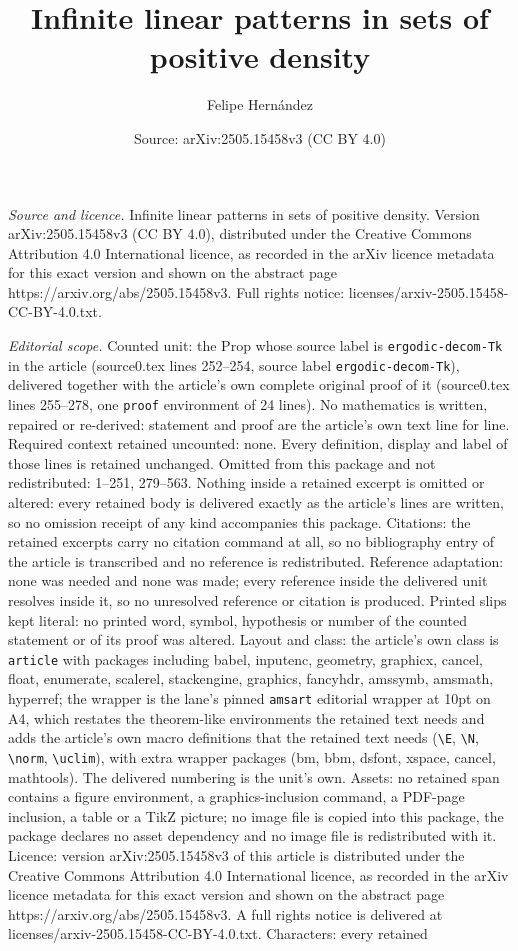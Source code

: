\documentclass[10pt,a4paper]{amsart}
\title[Infinite linear patterns in sets of positive density]{Infinite linear patterns in sets of positive density}
\author{Felipe Hern\'andez}
\date{Source: arXiv:2505.15458v3 (CC BY 4.0)}
\begin{document}
\maketitle

\noindent\emph{Source and licence.} Infinite linear patterns in sets of positive density. Version arXiv:2505.15458v3 (CC BY 4.0), distributed under the Creative Commons Attribution 4.0 International licence, as recorded in the arXiv licence metadata for this exact version and shown on the abstract page https://arxiv.org/abs/2505.15458v3. Full rights notice: licenses/arxiv-2505.15458-CC-BY-4.0.txt.\par\smallskip

\noindent\textit{Editorial scope.} Counted unit: the Prop whose source label is \texttt{ergodic-decom-Tk} in the article (source0.tex lines 252--254, source label \texttt{ergodic-decom-Tk}), delivered together with the article's own complete original proof of it (source0.tex lines 255--278, one \texttt{proof} environment of 24 lines). No mathematics is written, repaired or re-derived: statement and proof are the article's own text line for line. Required context retained uncounted: none. Every definition, display and label of those lines is retained unchanged. Omitted from this package and not redistributed: 1--251, 279--563. Nothing inside a retained excerpt is omitted or altered: every retained body is delivered exactly as the article's lines are written, so no omission receipt of any kind accompanies this package. Citations: the retained excerpts carry no citation command at all, so no bibliography entry of the article is transcribed and no reference is redistributed. Reference adaptation: none was needed and none was made; every reference inside the delivered unit resolves inside it, so no unresolved reference or citation is produced. Printed slips kept literal: no printed word, symbol, hypothesis or number of the counted statement or of its proof was altered. Layout and class: the article's own class is \texttt{article} with packages including babel, inputenc, geometry, graphicx, cancel, float, enumerate, scalerel, stackengine, graphics, fancyhdr, amssymb, amsmath, hyperref; the wrapper is the lane's pinned \texttt{amsart} editorial wrapper at 10pt on A4, which restates the theorem-like environments the retained text needs and adds the article's own macro definitions that the retained text needs (\texttt{\textbackslash E}, \texttt{\textbackslash N}, \texttt{\textbackslash norm}, \texttt{\textbackslash uclim}), with extra wrapper packages (bm, bbm, dsfont, xspace, cancel, mathtools). The delivered numbering is the unit's own. Assets: no retained span contains a figure environment, a graphics-inclusion command, a PDF-page inclusion, a table or a TikZ picture; no image file is copied into this package, the package declares no asset dependency and no image file is redistributed with it. Licence: version arXiv:2505.15458v3 of this article is distributed under the Creative Commons Attribution 4.0 International licence, as recorded in the arXiv licence metadata for this exact version and shown on the abstract page https://arxiv.org/abs/2505.15458v3. A full rights notice is delivered at licenses/arxiv-2505.15458-CC-BY-4.0.txt. Characters: every retained 
\end{document}
